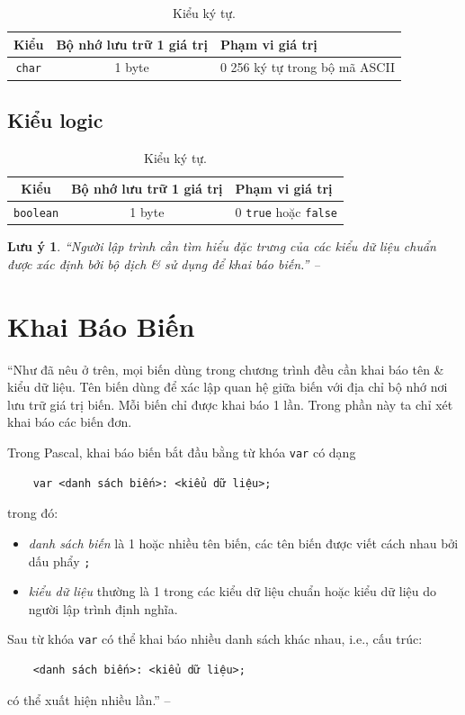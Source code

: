 \documentclass[oneside]{book}
\numberwithin{equation}{section}
\newtheorem{luuy}{Lưu ý}[section]
\begin{document}
\begin{table}[H]
	\centering
	\begin{tabular}{|c|c|l|}
		\hline
		\textbf{Kiểu} & \textbf{Bộ nhớ lưu trữ 1 giá trị} & \textbf{Phạm vi giá trị} \\
		\hline
		\texttt{char} & 1 byte & $0$ 256 ký tự trong bộ mã ASCII \\
		\hline
	\end{tabular}
	\caption{Kiểu ký tự.}
\end{table}

\subsection{Kiểu logic}

\begin{table}[H]
	\centering
	\begin{tabular}{|c|c|l|}
		\hline
		\textbf{Kiểu} & \textbf{Bộ nhớ lưu trữ 1 giá trị} & \textbf{Phạm vi giá trị} \\
		\hline
		\texttt{boolean} & 1 byte & $0$ \texttt{true} hoặc \texttt{false} \\
		\hline
	\end{tabular}
	\caption{Kiểu ký tự.}
\end{table}

\begin{luuy}
	``Người lập trình cần tìm hiểu đặc trưng của các kiểu dữ liệu chuẩn được xác định bởi bộ dịch \& sử dụng để khai báo biến.'' -- \cite[p. 22]{SGK_Tin_Hoc_11}
\end{luuy}


\section{Khai Báo Biến}
``Như đã nêu ở trên, mọi biến dùng trong chương trình đều cần khai báo tên \& kiểu dữ liệu. Tên biến dùng để xác lập quan hệ giữa biến với địa chỉ bộ nhớ nơi lưu trữ giá trị biến. Mỗi biến chỉ được khai báo 1 lần. Trong phần này ta chỉ xét khai báo các biến đơn.

Trong Pascal, khai báo biến bắt đầu bằng từ khóa \texttt{var} có dạng
\begin{verbatim}
	var <danh sách biến>: <kiểu dữ liệu>;
\end{verbatim}
trong đó:
\begin{itemize}
	\item \textit{danh sách biến} là 1 hoặc nhiều tên biến, các tên biến được viết cách nhau bởi dấu phẩy \texttt{;}
	\item \textit{kiểu dữ liệu} thường là 1 trong các kiểu dữ liệu chuẩn hoặc kiểu dữ liệu do người lập trình định nghĩa.
\end{itemize}
Sau từ khóa \texttt{var} có thể khai báo nhiều danh sách khác nhau, i.e., cấu trúc:
\begin{verbatim}
	<danh sách biến>: <kiểu dữ liệu>;
\end{verbatim}
có thể xuất hiện nhiều lần.'' -- \cite[pp. 22--23]{SGK_Tin_Hoc_11}
\end{document}
